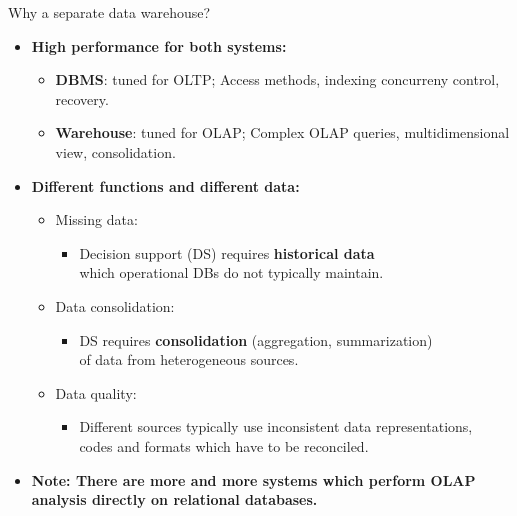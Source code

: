\documentclass[aspectratio=169,t]{beamer}
\begin{document}
  { 
    \begin{frame}{Why a separate data warehouse?}
    \begin{itemize}
      \item \textbf{High performance for both systems:}
      \begin{itemize}
        \item \textbf{\color{airforceblue}DBMS}: tuned for OLTP; Access methods, indexing concurreny control, recovery.
        \item \textbf{\color{airforceblue}Warehouse}: tuned for OLAP; Complex OLAP queries, multidimensional view, consolidation.
      \end{itemize}
      \item \textbf{Different functions and different data:}
      \begin{itemize}
        \item Missing data:
        \begin{itemize}
          \item Decision support (DS) requires \textbf{\color{airforceblue}historical data} \\ which operational DBs do not typically maintain.
        \end{itemize}
        \item Data consolidation:
        \begin{itemize}
          \item DS requires \textbf{\color{airforceblue}consolidation} (aggregation, summarization) \\
          of data from heterogeneous sources.
        \end{itemize}
        \item Data quality:
        \begin{itemize}
          \item Different sources typically use inconsistent data representations, \\ codes and formats which have to be reconciled.
        \end{itemize}
      \end{itemize}
      \item \textbf{Note: There are more and more systems which perform OLAP\\ analysis directly on relational databases.}
    \end{itemize}
    \end{frame}
  }
\end{document}
